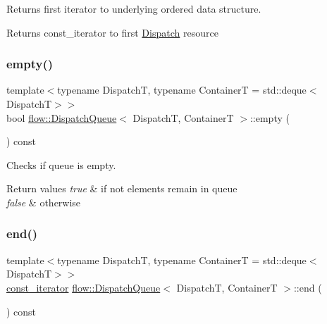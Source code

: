 Returns first iterator to underlying ordered data structure. 

\begin{DoxyReturn}{Returns}
{\ttfamily const\+\_\+iterator} to first \hyperlink{classflow_1_1_dispatch}{Dispatch} resource 
\end{DoxyReturn}
\mbox{\label{classflow_1_1_dispatch_queue_a447412abd83540a6c595dd7a17116c6c}} 
\subsubsection{\texorpdfstring{empty()}{empty()}}
{\footnotesize\ttfamily template$<$typename DispatchT, typename ContainerT = std\+::deque$<$\+Dispatch\+T$>$$>$ \\
bool \hyperlink{classflow_1_1_dispatch_queue}{flow\+::\+Dispatch\+Queue}$<$ DispatchT, ContainerT $>$\+::empty (\begin{DoxyParamCaption}{ }\end{DoxyParamCaption}) const\hspace{0.3cm}{\ttfamily [inline]}}



Checks if queue is empty. 


\begin{DoxyRetVals}{Return values}
{\em true} & if not elements remain in queue \\
\hline
{\em false} & otherwise \\
\hline
\end{DoxyRetVals}
\mbox{\label{classflow_1_1_dispatch_queue_a359b294ce203e10ee9fafc147f6638ff}} 
\subsubsection{\texorpdfstring{end()}{end()}}
{\footnotesize\ttfamily template$<$typename DispatchT, typename ContainerT = std\+::deque$<$\+Dispatch\+T$>$$>$ \\
\hyperlink{classflow_1_1_dispatch_queue_a307496fdc34a2d59e11114dabf85dc8a}{const\+\_\+iterator} \hyperlink{classflow_1_1_dispatch_queue}{flow\+::\+Dispatch\+Queue}$<$ DispatchT, ContainerT $>$\+::end (\begin{DoxyParamCaption}{ }\end{DoxyParamCaption}) const\hspace{0.3cm}{\ttfamily [inline]}}



